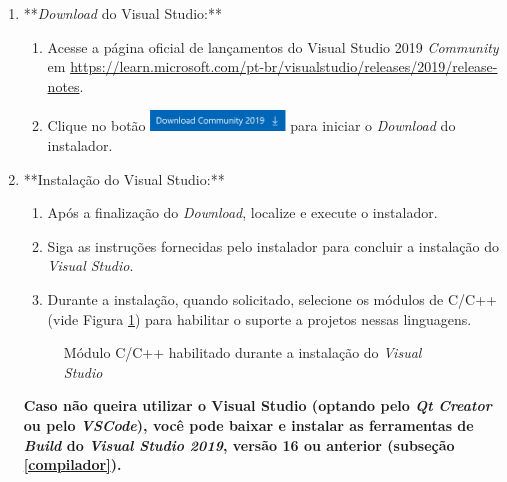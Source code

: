 \documentclass[a4paper,11pt]{article}
\newcommand{\qtcreator}{\textit{Qt Creator}}
\newcommand{\vscode}{\textit{VSCode}}
\newcommand{\visualstudio}{\textit{Visual Studio}}
\newcommand{\download}{\textit{Download}}
\newcommand{\cautionbox}[1]{
	\vskip 5mm
	\begin{leftbar}
		\textbf{#1}
	\end{leftbar}
	\vskip 5mm
}
\begin{document}
\begin{enumerate}
	\item **\download{} do Visual Studio:**
	\begin{enumerate}
		\item Acesse a página oficial de lançamentos do Visual Studio 2019 \emph{Community} em \url{https://learn.microsoft.com/pt-br/visualstudio/releases/2019/release-notes}.
		\item Clique no botão \includegraphics[height=1.5em]{images/vsdownloadbutton.png} para iniciar o \download{} do instalador.
	\end{enumerate}
	
	\item **Instalação do Visual Studio:**
	\begin{enumerate}
		\item Após a finalização do \download{}, localize e execute o instalador.
		\item Siga as instruções fornecidas pelo instalador para concluir a instalação do \visualstudio{}.
		\item Durante a instalação, quando solicitado, selecione os módulos de C/C++ (vide Figura \ref{fig:vsworkloadcpp}) para habilitar o suporte a projetos nessas linguagens.
	\end{enumerate}
	
	\begin{figure}[H]\centering
		\caption{Módulo C/C++ habilitado durante a instalação do \visualstudio{}}\label{fig:vsworkloadcpp}
	\end{figure}

\cautionbox{
 Caso não queira utilizar o Visual Studio (optando pelo \qtcreator{} ou pelo \vscode{}), você pode baixar e instalar as ferramentas de \textit{Build} do \textit{Visual Studio 2019}, versão 16 ou anterior (subseção \ref{compilador}).
}


\end{enumerate}
\end{document}
